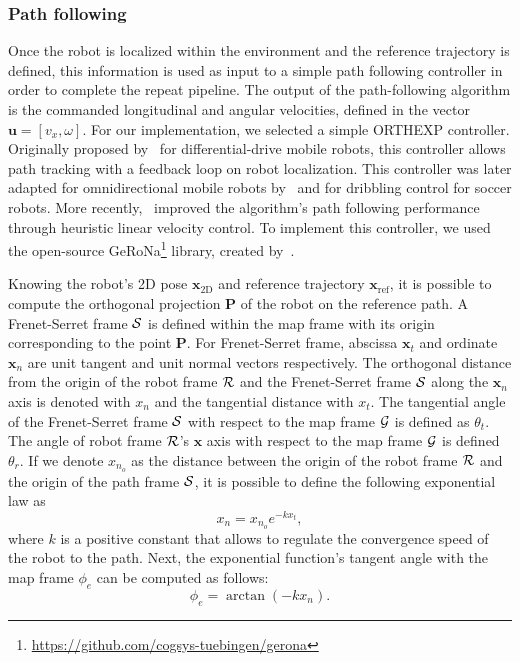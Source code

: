 \lightlipsum[1]

\subsubsection{Path following}
\label{sec:orthexp}


Once the robot is localized within the environment and the reference trajectory is defined, this information is used as input to a simple path following controller in order to complete the repeat pipeline.
The output of the path-following algorithm is the commanded longitudinal and angular velocities, defined in the vector $\bm u = [v_x, \omega]$.
For our implementation, we selected a simple \ac{ORTHEXP} controller. 
Originally proposed by~\citet{Mojaev2004} for differential-drive mobile robots, this controller allows path tracking with a feedback loop on robot localization.
This controller was later adapted for omnidirectional mobile robots by~\citet{Li2007} and for dribbling control for soccer robots.
More recently,~\citet{Huskic2017} improved the algorithm's path following performance through heuristic linear velocity control.
To implement this controller, we used the open-source \ac{GeRoNa}\footnote{\url{https://github.com/cogsys-tuebingen/gerona}} library, created by~\citet{Huskic2019}.

Knowing the robot's 2D pose $\bm x_{\text{2D}}$ and reference trajectory $\bm x_{\text{ref}}$, it is possible to compute the orthogonal projection $\bm P$ of the robot on the reference path.
A Frenet-Serret frame $\mathcal{S}$ is defined within the map frame with its origin corresponding to the point $\bm P$.
For Frenet-Serret frame, abscissa $\bm x_t$ and ordinate $\bm x_n$ are unit tangent and unit normal vectors respectively. 
The orthogonal distance from the origin of the robot frame $\mathcal{R}$ and the Frenet-Serret frame $\mathcal{S}$ along the $\bm x_n$ axis is denoted with $x_n$ and the tangential distance with $x_t$.
The tangential angle of the Frenet-Serret frame $\mathcal{S}$ with respect to the map frame $\mathcal{G}$ is defined as $\theta_t$.
The angle of robot frame $\mathcal{R}$'s $\bm x$ axis with respect to the map frame $\mathcal{G}$ is defined $\theta_r$. %
If we denote $x_{n_o}$ as the distance between the origin of the robot frame $\mathcal{R}$ and the origin of the path frame $\mathcal{S}$, it is possible to define the following exponential law as
\begin{equation}
\label{eq:exp_law}
	x_n = x_{n_o} e^{-k x_t},
\end{equation}
where $k$ is a positive constant that allows to regulate the convergence speed of the robot to the path.
Next, the exponential function's tangent angle with the map frame $\phi_e$ can be computed as follows:
\begin{equation}
\label{eq:exp_angle}
\phi_e = \arctan(-k x_n).
\end{equation}

